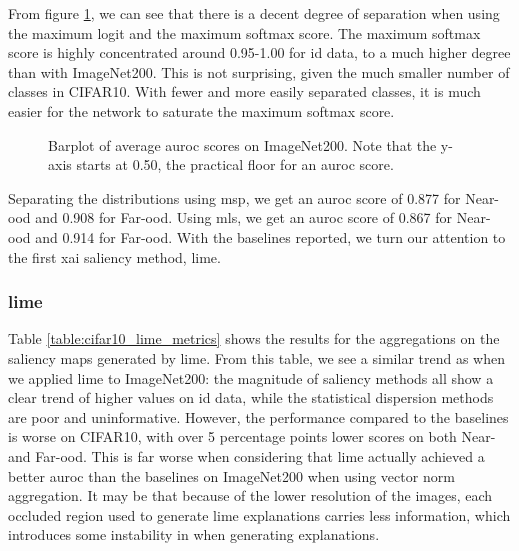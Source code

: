\documentclass[UKenglish]{uiomasterthesis} %
\theoremstyle{definition}
\begin{document}
From figure \ref{fig:cifar10_logits_distribution}, we can see that there is a decent degree of separation when using the maximum logit and the maximum softmax score. The maximum softmax score is highly concentrated around 0.95-1.00 for \ac{id} data, to a much higher degree than with ImageNet200. This is not surprising, given the much smaller number of classes in CIFAR10. With fewer and more easily separated classes, it is much easier for the network to saturate the maximum softmax score.

\begin{figure}[H]
    \begin{center}
        
    \end{center}
    \caption[Average scores]{Barplot of average \ac{auroc} scores on ImageNet200. Note that the y-axis starts at 0.50, the practical floor for an \ac{auroc} score.}
    \label{fig:cifar10_logits_distribution}
\end{figure}

Separating the distributions using \ac{msp}, we get an \ac{auroc} score of 0.877 for Near-\ac{ood} and 0.908 for Far-\ac{ood}. Using \ac{mls}, we get an \ac{auroc} score of 0.867 for Near-\ac{ood} and 0.914 for Far-\ac{ood}. With the baselines reported, we turn our attention to the first \ac{xai} saliency method, \ac{lime}.

\subsubsection{\ac{lime}}

Table \ref{table:cifar10_lime_metrics} shows the results for the aggregations on the saliency maps generated by \ac{lime}. From this table, we see a similar trend as when we applied \ac{lime} to ImageNet200: the magnitude of saliency methods all show a clear trend of higher values on \ac{id} data, while the statistical dispersion methods are poor and uninformative. However, the performance compared to the baselines is worse on CIFAR10, with over 5 percentage points lower scores on both Near- and Far-\ac{ood}. This is far worse when considering that \ac{lime} actually achieved a better \ac{auroc} than the baselines on ImageNet200 when using vector norm aggregation. It may be that because of the lower resolution of the images, each occluded region used to generate \ac{lime} explanations carries less information, which introduces some instability in when generating explanations.
\end{document}
